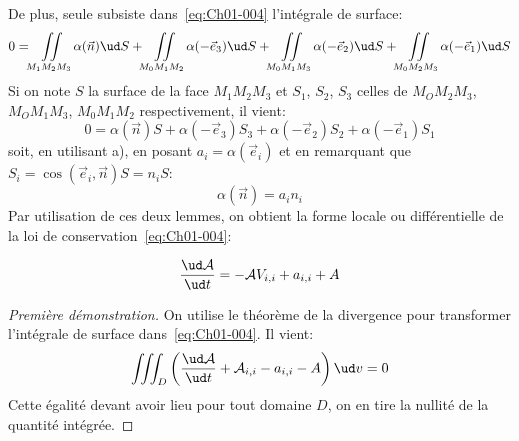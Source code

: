 De plus, seule subsiste dans~\eqref{eq:Ch01-004} l'intégrale de surface:
\begin{equation*}
    0=\iint\limits_{M_1M_2M_3}\alpha(\vec{n}) \ud S+\iint\limits_{M_0M_1M_2}\alpha(-\vec{e}_3) \ud S+ \iint\limits_{M_0M_1M_3}\alpha(-\vec{e}_2) \ud S+\iint\limits_{M_0M_2M_3}\alpha(-\vec{e}_1) \ud S
\end{equation*}
Si on note $S$ la surface de la face $M_1M_2M_3$ et $S_1$, $S_2$, $S_3$ celles de $M_OM_2M_3$, $M_OM_1M_3$, $M_0M_1M_2$ respectivement, il vient:
\begin{equation*}
    0 = \alpha(\vec{n})S+\alpha(-\vec{e}_3)S_3+\alpha(-\vec{e}_2)S_2+\alpha(-\vec{e}_1)S_1
\end{equation*}
soit, en utilisant a), en posant $a_i=\alpha(\vec{e}_i)$ et en remarquant que $S_i=\cos(\vec{e}_i,\vec{n})S=n_iS$:
\begin{equation*}
    \alpha(\vec{n})=a_in_i
\end{equation*}
Par utilisation de ces deux lemmes, on obtient la forme locale ou différentielle de la loi de conservation~\eqref{eq:Ch01-004}:
\begin{thm}
    \begin{equation}
        \frac{\ud \mathcal{A}}{\ud t} = -\mathcal{A}V_{i,i} + a_{i,i} + A
        \label{eq:Ch01-008}
    \end{equation}
    \label{thm:Ch01-1}
\end{thm}
\begin{proof}[Première démonstration]
    On utilise le théorème de la divergence pour transformer l'intégrale de surface dans~\eqref{eq:Ch01-004}.
    Il vient:
    \begin{equation*}
        \iiint_D\left(\frac{\ud \mathcal{A}}{\ud t}+\mathcal{A}_{i,i}-a_{i,i}-A\right)\ud v=0
    \end{equation*}
    Cette égalité devant avoir lieu pour tout domaine $D$, on en tire la nullité de la quantité intégrée.
\end{proof}

